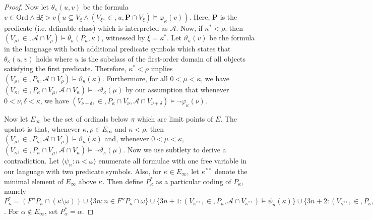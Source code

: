 \documentclass{article}
\newcommand{\Ord}{\mathrm{Ord}}
\theoremstyle{definition}
\theoremstyle{plain}
\theoremstyle{plain}
\theoremstyle{plain}
\theoremstyle{plain}
\theoremstyle{remark}
\theoremstyle{remark}
\theoremstyle{remark}
\theoremstyle{plain}
\theoremstyle{plain}
\theoremstyle{plain}
\begin{document}
\begin{proof}
Now let $\theta_\kappa(u, v)$ be the formula $v \in \Ord \land \exists \xi > v (u \subseteq V_\xi \land (V_\xi, \in, u, \mathbf{P} \cap V_\xi) \models \varphi_\kappa(v))$. Here, $\mathbf{P}$ is the predicate (i.e. definable class) which is interpreted as $\mathcal{A}$. Now, if $\kappa^* < \rho$, then $(V_\rho, \in, \mathcal{A} \cap V_\rho) \models \theta_\kappa(P_\kappa, \kappa)$, witnessed by $\xi = \kappa^*$. Let $\vartheta_\kappa(v)$ be the formula in the language with both additional predicate symbols which states that $\theta_\kappa(u, v)$ holds where $u$ is the subclass of the first-order domain of all objects satisfying the first predicate. Therefore, $\kappa^* < \rho$ implies $(V_\rho, \in, P_\kappa, \mathcal{A} \cap V_\rho) \models \vartheta_\kappa(\kappa)$. Furthermore, for all $0 < \mu < \kappa$, we have $(V_\kappa, \in, P_\kappa \cap V_\mu, \mathcal{A} \cap V_\kappa) \models \neg \vartheta_\kappa(\mu)$ by our assumption that whenever $0 < \nu, \delta < \kappa$, we have $(V_{\nu+\delta}, \in, P_\kappa \cap V_\nu, \mathcal{A} \cap V_{\nu+\delta}) \models \neg \varphi_\kappa(\nu)$.

Now let $E_\infty$ be the set of ordinals below $\pi$ which are limit points of $E$. The upshot is that, whenever $\kappa, \rho \in E_\infty$ and $\kappa < \rho$, then $(V_\rho, \in, P_\kappa, \mathcal{A} \cap V_\rho) \models \vartheta_\kappa(\kappa)$ and, whenever $0 < \mu < \kappa$, $(V_\kappa, \in, P_\kappa \cap V_\mu, \mathcal{A} \cap V_\kappa) \models \neg \vartheta_\kappa(\mu)$. Now we use subtlety to derive a contradiction. Let $\langle \psi_n: n < \omega \rangle$ enumerate all formulae with one free variable in our language with two predicate symbols. Also, for $\kappa \in E_\infty$, let $\kappa^{**}$ denote the minimal element of $E_\infty$ above $\kappa$. Then define $P_\kappa^*$ as a particular coding of $P_\kappa$, namely $P_\kappa^* = (F''P_\kappa \cap (\kappa \setminus \omega)) \cup \{3n: n \in F''P_\kappa \cap \omega\} \cup \{3n+1: (V_{\kappa^{**}}, \in, P_\kappa, \mathcal{A} \cap V_{\kappa^{**}}) \models \psi_n(\kappa)\} \cup \{3n+2: (V_{\kappa^{**}}, \in, P_\kappa, \mathcal{A} \cap V_{\kappa^{**}}) \models \neg \psi_n(\kappa)\}$. For $\alpha \notin E_\infty$, set $P_\alpha^* = \alpha$. 


\end{proof}
\end{document}
